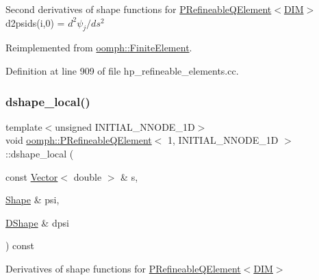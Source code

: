 Second derivatives of shape functions for \hyperlink{classoomph_1_1PRefineableQElement}{P\+Refineable\+Q\+Element$<$\+D\+I\+M$>$} d2psids(i,0) = $ d^2 \psi_j / d s^2 $ 

Reimplemented from \hyperlink{classoomph_1_1FiniteElement_a53e5051582d9da07b9d35da9debd0cd7}{oomph\+::\+Finite\+Element}.



Definition at line 909 of file hp\+\_\+refineable\+\_\+elements.\+cc.

\mbox{\label{classoomph_1_1PRefineableQElement_3_011_00_01INITIAL__NNODE__1D_01_4_aebf69d287fafae0e38ad61d8e3007c29}} 
\subsubsection{\texorpdfstring{dshape\+\_\+local()}{dshape\_local()}}
{\footnotesize\ttfamily template$<$unsigned I\+N\+I\+T\+I\+A\+L\+\_\+\+N\+N\+O\+D\+E\+\_\+1D$>$ \\
void \hyperlink{classoomph_1_1PRefineableQElement}{oomph\+::\+P\+Refineable\+Q\+Element}$<$ 1, I\+N\+I\+T\+I\+A\+L\+\_\+\+N\+N\+O\+D\+E\+\_\+1D $>$\+::dshape\+\_\+local (\begin{DoxyParamCaption}\item[{const \hyperlink{classoomph_1_1Vector}{Vector}$<$ double $>$ \&}]{s,  }\item[{\hyperlink{classoomph_1_1Shape}{Shape} \&}]{psi,  }\item[{\hyperlink{classoomph_1_1DShape}{D\+Shape} \&}]{dpsi }\end{DoxyParamCaption}) const\hspace{0.3cm}{\ttfamily [virtual]}}



Derivatives of shape functions for \hyperlink{classoomph_1_1PRefineableQElement}{P\+Refineable\+Q\+Element$<$\+D\+I\+M$>$} 



